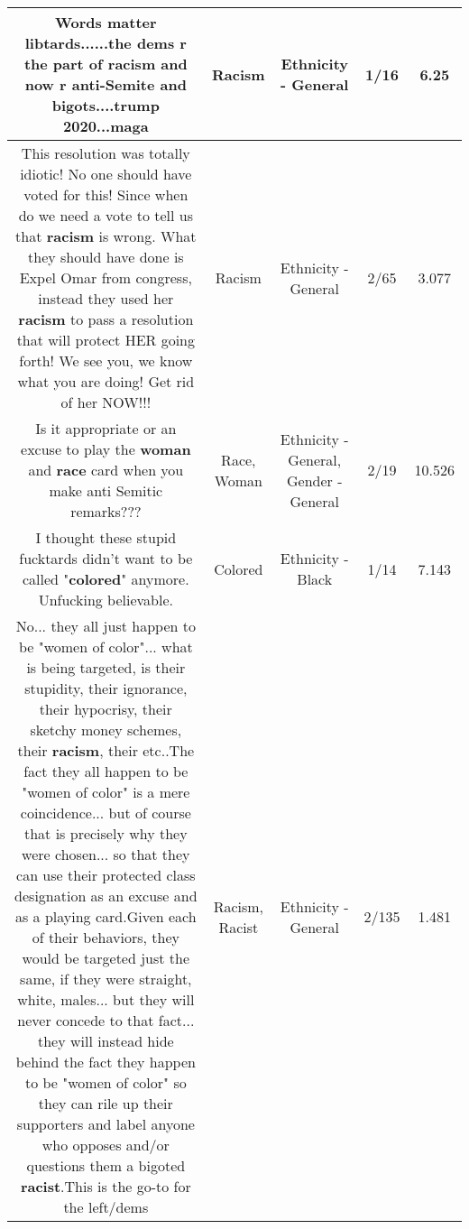 \documentclass[11pt]{article}
\newlength\mylength
\begin{document}
\begin{center}
\begin{longtable}{|C{.65\mylength}|C{.30\mylength}|C{.12\mylength}|C{.12\mylength}|C{.12\mylength}|}
  \small Words matter libtards......the dems r the part of \textbf{racism} and now r anti-Semite and bigots....trump 2020...maga\normalsize   & Racism & Ethnicity - General & 1/16 & 6.25 \\  \hline
  \small This resolution was totally idiotic! No one should have voted for this! Since when do we need a vote to tell us that \textbf{racism} is wrong. What they should have done is Expel Omar from congress, instead they used her \textbf{racism} to pass a resolution that will protect HER going forth! We see you, we know what you are doing! Get rid of her NOW!!!\normalsize   & Racism & Ethnicity - General & 2/65 & 3.077 \\  \hline
  \small Is it appropriate or an excuse  to play the \textbf{woman} and \textbf{race} card when you make anti Semitic remarks???\normalsize   & Race, Woman & Ethnicity - General, Gender - General & 2/19 & 10.526 \\  \hline
  \small I thought these stupid fucktards didn't want to be called "\textbf{colored}" anymore. Unfucking believable.\normalsize   & Colored & Ethnicity - Black & 1/14 & 7.143 \\  \hline
  \small No... they all just happen to be "women of color"... what is being targeted, is their stupidity, their ignorance, their hypocrisy, their sketchy money schemes, their \textbf{racism}, their etc..The fact they all happen to be "women of color" is a mere coincidence... but of course that is precisely why they were chosen... so that they can use their protected class designation as an excuse and as a playing card.Given each of their behaviors, they would be targeted just the same, if they were straight, white, males... but they will never concede to that fact... they will instead hide behind the fact they happen to be "women of color" so they can rile up their supporters and label anyone who opposes and/or questions them a bigoted \textbf{racist}.This is the go-to for the left/dems\normalsize   & Racism, Racist & Ethnicity - General & 2/135 & 1.481 \\  \hline

\end{longtable}
\end{center}
\end{document}
